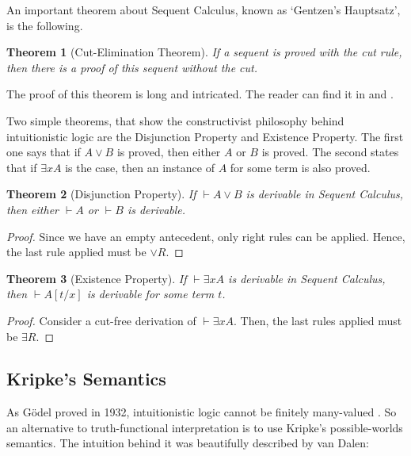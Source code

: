 \documentclass[12pt,a4paper]{article}
\newtheorem{theorem}{Theorem}[section]
\theoremstyle{definition}
\begin{document}
An important theorem about Sequent Calculus, known as `Gentzen's Hauptsatz', is the following.

\label{Hauptsatz} 
\begin{theorem}[Cut-Elimination Theorem]
    If a sequent is proved with the cut rule, then there is a proof of this sequent without the cut.
\end{theorem}

The proof of this theorem is long and intricated. The reader can find it in \cite{negri2008structural} and \cite{mancosu2021introduction}.

Two simple theorems, that show the constructivist philosophy behind intuitionistic logic are the Disjunction Property and Existence Property. The first one says that if $A \lor B$ is proved, then either $A$ or $B$ is proved. The second states that if $\exists x A$ is the case, then an instance of $A$ for some term is also proved.

\begin{theorem}[Disjunction Property]
    If $\vdash A \lor B$ is derivable in Sequent Calculus, then either $\vdash A$ or $\vdash B$ is derivable.
\end{theorem}

\begin{proof}
    Since we have an empty antecedent, only right rules can be applied. Hence, the last rule applied must be $\lor R$.
\end{proof}

\begin{theorem}[Existence Property]
    If $\vdash \exists x A$ is derivable in Sequent Calculus, then $\vdash A[t/x]$ is derivable for some term $t$.
\end{theorem}

\begin{proof}
    Consider a cut-free derivation of $\vdash \exists x A$. Then, the last rules applied must be $\exists R$. 
\end{proof}

\subsection{Kripke's Semantics}
\label{Kripke-Semantics}

As Gödel proved in 1932, intuitionistic logic cannot be finitely many-valued \cite{sep-goedel}. So an alternative to truth-functional interpretation is to use Kripke's possible-worlds semantics. The intuition behind it was beautifully described by van Dalen:
\end{document}
